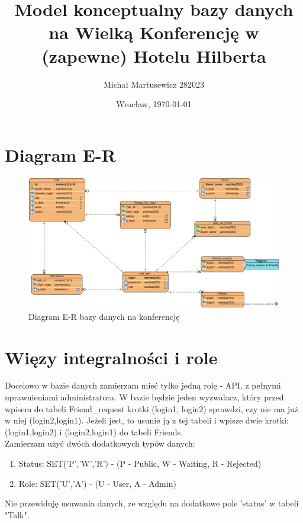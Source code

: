 \documentclass{article}
\author{Michał Martusewicz 282023}
\date{Wrocław, \today}
\title{\textbf{Model konceptualny bazy danych na Wielką Konferencję w (zapewne) Hotelu Hilberta}}
\begin{document}
\maketitle
\section{Diagram E-R}
\begin{figure}[H]
    \centering
	\includegraphics[width= 1 \textwidth]{Konferencja.png}
    \caption{Diagram E-R bazy danych na konferencję}
 	\label{diagram}
\end{figure}
\section{Więzy integralności i role}
Docelowo w bazie danych zamierzam mieć tylko jedną rolę - API, z pełnymi uprawnieniami administratora.
W bazie będzie jeden wyzwalacz, który przed wpisem do tabeli Friend\_request krotki (login1, login2) sprawdzi, czy nie ma już w niej (login2,login1). Jeżeli jest, to usunie ją z tej tabeli i wpisze dwie krotki: (login1,login2) i (login2,login1) do tabeli Friends.\\
Zamierzam użyć dwóch dodatkowych typów danych:
\begin{enumerate}
\item Status: SET('P','W','R') - (P - Public, W - Waiting, R - Rejected)
\item Role: SET('U','A') - (U -  User, A - Admin)
\end{enumerate}
Nie przewiduję usuwania danych, ze względu na dodatkowe pole 'status' w tabeli "Talk".
\end{document}
